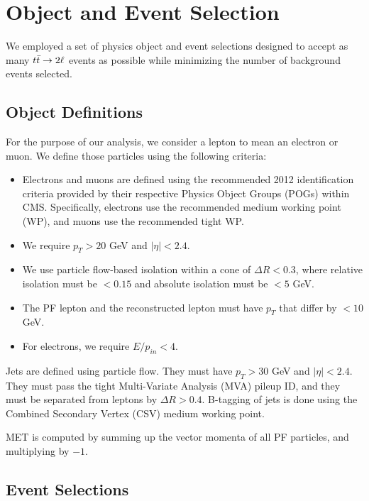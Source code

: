 \section{Object and Event Selection}
\label{sec:afb:selections}

We employed a set of physics object and event selections designed to
accept as many $t\bar{t} \rightarrow 2\ell$ events as possible while minimizing the
number of background events selected.

\subsection{Object Definitions}
\label{ssec:afb:objdefs}

For the purpose of our analysis, we consider a lepton to mean an
electron or muon. We define those particles using the following
criteria:

\begin{itemize}
\item Electrons and muons are defined using the recommended
  2012 identification criteria provided by their respective Physics Object
  Groups (POGs) within CMS. Specifically, electrons use the
  recommended medium working point (WP), and muons use the recommended
  tight WP.
\item We require $p_T > 20$ GeV and $|\eta| < 2.4$.
\item We use particle flow-based isolation within a cone of $\Delta R
  < 0.3$, where relative isolation must be $< 0.15$ and absolute
  isolation must be $< 5$ GeV. %
\item The PF lepton and the reconstructed lepton must have $p_T$ that
  differ by $< 10$ GeV.
\item For electrons, we require $E / p_{in} < 4$. %
\end{itemize}

Jets are defined using particle flow. They must have $p_T > 30$ GeV
and $|\eta| < 2.4$. They must pass the tight Multi-Variate Analysis
(MVA) pileup ID, and they must be separated from leptons by $\Delta R
> 0.4$. B-tagging of jets is done using the Combined Secondary Vertex
(CSV) medium working point.

MET is computed by summing up the vector momenta of all PF particles,
and multiplying by $-1$.

\subsection{Event Selections}
\label{ssec:afb:eventsel}

